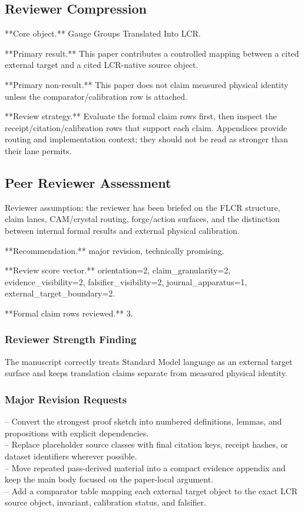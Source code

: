 \documentclass[11pt]{article}
\begin{document}
\subsection*{Reviewer Compression}

**Core object.** Gauge Groups Translated Into LCR.

**Primary result.** This paper contributes a controlled mapping between a cited external target and a cited LCR-native source object.

**Primary non-result.** This paper does not claim measured physical identity unless the comparator/calibration row is attached.

**Review strategy.** Evaluate the formal claim rows first, then inspect the receipt/citation/calibration rows that support each claim. Appendices provide routing and implementation context; they should not be read as stronger than their lane permits.

\subsection*{Peer Reviewer Assessment}

Reviewer assumption: the reviewer has been briefed on the FLCR structure, claim lanes, CAM/crystal routing, forge/action surfaces, and the distinction between internal formal results and external physical calibration.

**Recommendation.** major revision, technically promising.

**Review score vector.** orientation=2, claim\_granularity=2, evidence\_visibility=2, falsifier\_visibility=2, journal\_apparatus=1, external\_target\_boundary=2.

**Formal claim rows reviewed.** 3.

\subsubsection*{Reviewer Strength Finding}

The manuscript correctly treats Standard Model language as an external target surface and keeps translation claims separate from measured physical identity.

\subsubsection*{Major Revision Requests}

\noindent{}-- Convert the strongest proof sketch into numbered definitions, lemmas, and propositions with explicit dependencies.\\
\noindent{}-- Replace placeholder source classes with final citation keys, receipt hashes, or dataset identifiers wherever possible.\\
\noindent{}-- Move repeated pass-derived material into a compact evidence appendix and keep the main body focused on the paper-local argument.\\
\noindent{}-- Add a comparator table mapping each external target object to the exact LCR source object, invariant, calibration status, and falsifier.\\
\end{document}
